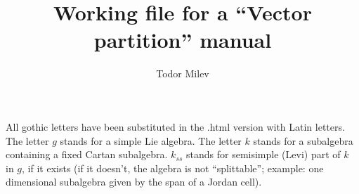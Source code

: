 \documentclass{article}
\title{Working file for a ``Vector partition'' manual}
\author{Todor Milev}
\begin{document}
\maketitle
All gothic letters have been substituted in the .html version with Latin letters. The letter $g$ stands for a simple Lie algebra.  The letter $k$ stands for a subalgebra containing a fixed Cartan subalgebra. $k_{ss}$ stands for semisimple (Levi) part of $k$ in $g$, if it exists (if it doesn't, the algebra is not ``splittable''; example: one dimensional subalgebra given by the span of a Jordan cell). 
\end{document}
